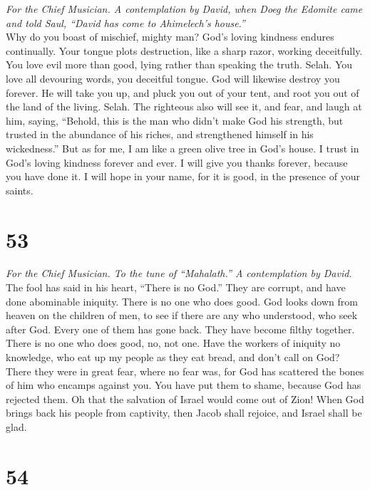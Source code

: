 \emph{For the Chief Musician. A contemplation by David, when Doeg the
Edomite came and told Saul, ``David has come to Ahimelech's house.''}\\
 Why do you boast of mischief, mighty man? God's loving
kindness endures continually.  Your tongue plots
destruction, like a sharp razor, working deceitfully.  You
love evil more than good, lying rather than speaking the truth. Selah.
 You love all devouring words, you deceitful tongue.
 God will likewise destroy you forever. He will take you
up, and pluck you out of your tent, and root you out of the land of the
living. Selah.  The righteous also will see it, and fear,
and laugh at him, saying,  ``Behold, this is the man who
didn't make God his strength, but trusted in the abundance of his
riches, and strengthened himself in his wickedness.''  But
as for me, I am like a green olive tree in God's house. I trust in God's
loving kindness forever and ever.  I will give you thanks
forever, because you have done it. I will hope in your name, for it is
good, in the presence of your saints.

\hypertarget{section-52}{%
\section{53}\label{section-52}}

\emph{For the Chief Musician. To the tune of ``Mahalath.'' A
contemplation by David.}\\
 The fool has said in his heart, ``There is no God.'' They
are corrupt, and have done abominable iniquity. There is no one who does
good.  God looks down from heaven on the children of men,
to see if there are any who understood, who seek after God.
 Every one of them has gone back. They have become filthy
together. There is no one who does good, no, not one. 
Have the workers of iniquity no knowledge, who eat up my people as they
eat bread, and don't call on God?  There they were in
great fear, where no fear was, for God has scattered the bones of him
who encamps against you. You have put them to shame, because God has
rejected them.  Oh that the salvation of Israel would come
out of Zion! When God brings back his people from captivity, then Jacob
shall rejoice, and Israel shall be glad.

\hypertarget{section-53}{%
\section{54}\label{section-53}}

